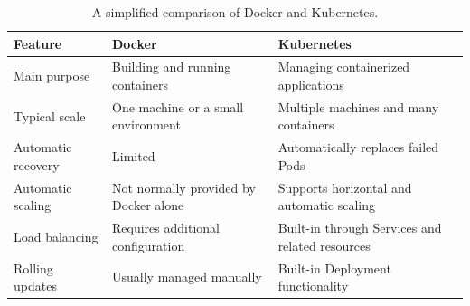 \documentclass[a4paper]{article}
\begin{document}
        \begin{table}[H]
            \centering
            \begin{tabular}{
                |p{}
                |p{}
                |p{}|
            }
                \hline
                \textbf{Feature}
                &
                \textbf{Docker}
                &
                \textbf{Kubernetes}
                \\
                \hline
                
                Main purpose
                &
                Building and running containers
                &
                Managing containerized applications
                \\
                \hline
                
                Typical scale
                &
                One machine or a small environment
                &
                Multiple machines and many containers
                \\
                \hline
                
                Automatic recovery
                &
                Limited
                &
                Automatically replaces failed Pods
                \\
                \hline
                
                Automatic scaling
                &
                Not normally provided by Docker alone
                &
                Supports horizontal and automatic scaling
                \\
                \hline
                
                Load balancing
                &
                Requires additional configuration
                &
                Built-in through Services and related resources
                \\
                \hline
                
                Rolling updates
                &
                Usually managed manually
                &
                Built-in Deployment functionality
                \\
                \hline
            \end{tabular}
            
            \caption{A simplified comparison of Docker and Kubernetes.}
        \end{table}
    
\end{document}
